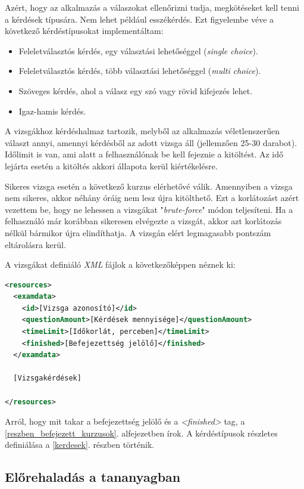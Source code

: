 \documentclass[12pt,a4paper]{article}
\newcommand{\xml}{\textit{XML}\xspace}
\begin{document}
	Azért, hogy az alkalmazás a válaszokat ellenőrizni tudja, megkötéseket kell tenni a kérdések típusára. Nem lehet például esszékérdés. Ezt figyelembe véve a következő kérdéstípusokat implementáltam:
	
	\begin{itemize}
		\item Feleletválasztós kérdés, egy választási lehetőséggel (\textit{single choice}).
		\item Feleletválasztós kérdés, több választási lehetőséggel (\textit{multi choice}).
		\item Szöveges kérdés, ahol a válasz egy szó vagy rövid kifejezés lehet.
		\item Igaz-hamis kérdés.
	\end{itemize}
	
	A vizsgákhoz kérdéshalmaz tartozik, melyből az alkalmazás véletlenszerűen választ annyi, amennyi kérdésből az adott vizsga áll (jellemzően 25-30 darabot). Időlimit is van, ami alatt a felhasználónak be kell fejeznie a kitöltést. Az idő lejárta esetén a kitöltés akkori állapota kerül kiértékelésre.
	
	Sikeres vizsga esetén a következő kurzus elérhetővé válik. Amennyiben a vizsga nem sikeres, akkor néhány óráig nem lesz újra kitölthető. Ezt a korlátozást azért vezettem be, hogy ne lehessen a vizsgákat "\textit{brute-force}" módon teljesíteni. Ha a felhasználó már korábban sikeresen elvégezte a vizsgát, akkor azt korlátozás nélkül bármikor újra elindíthatja. A vizsgán elért legmagasabb pontszám eltárolásra kerül.
	
	A vizsgákat definiáló \xml fájlok a következőképpen néznek ki:
	
	\begin{lstlisting}[language=XML]
<resources>
  <examdata>
	<id>[Vizsga azonosító]</id>
	<questionAmount>[Kérdések mennyisége]</questionAmount>
	<timeLimit>[Időkorlát, perceben]</timeLimit>
    <finished>[Befejezettség jelölő]</finished>
  </examdata>
  
  [Vizsgakérdések]
  
</resources>
	\end{lstlisting}

	Arról, hogy mit takar a befejezettség jelölő és a \textit{<finished>} tag, a \ref{reszben_befejezett_kurzusok}. alfejezetben írok. A kérdéstípusok részletes definiálása a \ref{kerdesek}. részben történik.
	
	\subsection{Előrehaladás a tananyagban}
	
\end{document}
